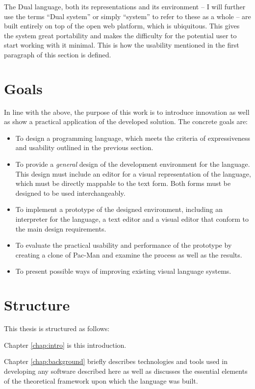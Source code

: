 The Dual language, both its representations and its environment -- I will further use the terms ``Dual system'' or simply ``system'' to refer to these as a whole -- are built entirely on top of the open web platform\cite{open_web_platform}, which is ubiquitous. This gives the system great portability and makes the difficulty for the potential user to start working with it minimal. This is how the usability mentioned in the first paragraph of this section is defined.

\section{Goals}
In line with the above, the purpose of this work is to introduce innovation as well as show a practical application of the developed solution. The concrete goals are:
\begin{itemize}
	\item To design a programming language, which meets the criteria of expressiveness and usability outlined in the previous section.
	\item To provide a \textit{general} design of the development environment for the language. This design must include an editor for a visual representation of the language, which must be directly mappable to the text form. Both forms must be designed to be used interchangeably.
    \item To implement a prototype of the designed environment, including an interpreter for the language, a text editor and a visual editor that conform to the main design requirements.
    \item To evaluate the practical usability and performance of the prototype by creating a clone of Pac-Man and examine the process as well as the results.
    \item To present possible ways of improving existing visual language systems.
\end{itemize}

\section{Structure}
This thesis is structured as follows:

Chapter \ref{chap:intro} is this introduction.

Chapter \ref{chap:background} briefly describes technologies and tools used in developing any software described here as well as discusses the essential elements of the theoretical framework upon which the language was built.


